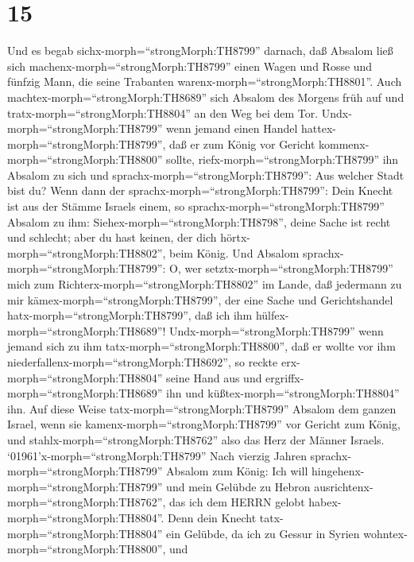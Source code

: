 \hypertarget{section-14}{%
\section{15}\label{section-14}}

 Und es begab sichx-morph=``strongMorph:TH8799'' darnach,
daß Absalom ließ sich machenx-morph=``strongMorph:TH8799'' einen Wagen
und Rosse und fünfzig Mann, die seine Trabanten
warenx-morph=``strongMorph:TH8801''.  Auch
machtex-morph=``strongMorph:TH8689'' sich Absalom des Morgens früh auf
und tratx-morph=``strongMorph:TH8804'' an den Weg bei dem Tor.
Undx-morph=``strongMorph:TH8799'' wenn jemand einen Handel
hattex-morph=``strongMorph:TH8799'', daß er zum König vor Gericht
kommenx-morph=``strongMorph:TH8800'' sollte,
riefx-morph=``strongMorph:TH8799'' ihn Absalom zu sich und
sprachx-morph=``strongMorph:TH8799'': Aus welcher Stadt bist du? Wenn
dann der sprachx-morph=``strongMorph:TH8799'': Dein Knecht ist aus der
Stämme Israels einem,  so
sprachx-morph=``strongMorph:TH8799'' Absalom zu ihm:
Siehex-morph=``strongMorph:TH8798'', deine Sache ist recht und schlecht;
aber du hast keinen, der dich hörtx-morph=``strongMorph:TH8802'', beim
König.  Und Absalom sprachx-morph=``strongMorph:TH8799'': O,
wer setztx-morph=``strongMorph:TH8799'' mich zum
Richterx-morph=``strongMorph:TH8802'' im Lande, daß jedermann zu mir
kämex-morph=``strongMorph:TH8799'', der eine Sache und Gerichtshandel
hatx-morph=``strongMorph:TH8799'', daß ich ihm
hülfex-morph=``strongMorph:TH8689''! 
Undx-morph=``strongMorph:TH8799'' wenn jemand sich zu ihm
tatx-morph=``strongMorph:TH8800'', daß er wollte vor ihm
niederfallenx-morph=``strongMorph:TH8692'', so reckte
erx-morph=``strongMorph:TH8804'' seine Hand aus und
ergriffx-morph=``strongMorph:TH8689'' ihn und
küßtex-morph=``strongMorph:TH8804'' ihn.  Auf diese Weise
tatx-morph=``strongMorph:TH8799'' Absalom dem ganzen Israel, wenn sie
kamenx-morph=``strongMorph:TH8799'' vor Gericht zum König, und
stahlx-morph=``strongMorph:TH8762'' also das Herz der Männer Israels.
 `01961'\textbar x-morph=``strongMorph:TH8799'' Nach vierzig
Jahren sprachx-morph=``strongMorph:TH8799'' Absalom zum König: Ich will
hingehenx-morph=``strongMorph:TH8799'' und mein Gelübde zu Hebron
ausrichtenx-morph=``strongMorph:TH8762'', das ich dem HERRN gelobt
habex-morph=``strongMorph:TH8804''.  Denn dein Knecht
tatx-morph=``strongMorph:TH8804'' ein Gelübde, da ich zu Gessur in
Syrien wohntex-morph=``strongMorph:TH8800'', und
